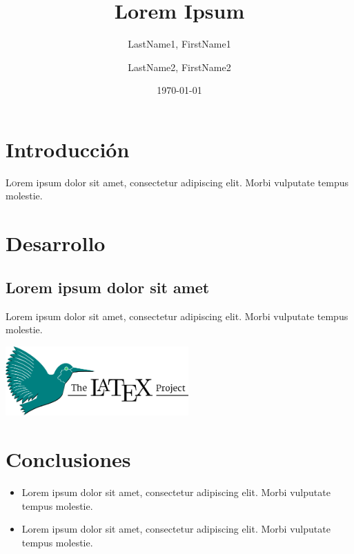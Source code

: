 \documentclass[twoside,twocolumn]{article}
\title{Lorem Ipsum}
\author{
	LastName1, FirstName1\\
	\and
	LastName2, FirstName2\\
}
\date{\today}
\begin{document}
\maketitle


\section{Introducción}

\lettrine[nindent=0em,lines=3]{L}orem ipsum dolor sit amet, consectetur adipiscing elit.
Morbi vulputate tempus molestie\cite{texbook}.


\section{Desarrollo}

\subsection{Lorem ipsum dolor sit amet}

Lorem ipsum dolor sit amet, consectetur adipiscing elit. Morbi vulputate tempus molestie\cite{latex:companion}.

\begin{center}
	\includegraphics[width=7cm]{./images/latex-logo} 
\end{center}
	

\section{Conclusiones}
\begin{itemize}	
	
	\item Lorem ipsum dolor sit amet, consectetur adipiscing elit. Morbi vulputate tempus molestie.
	\item Lorem ipsum dolor sit amet, consectetur adipiscing elit. Morbi vulputate tempus molestie.

\end{itemize}


 
 
\end{document}
